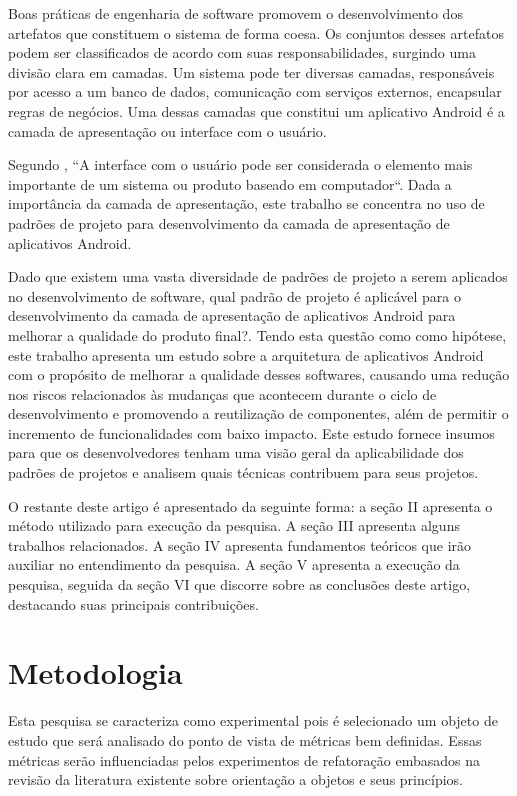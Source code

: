 \documentclass[conference]{IEEEtran}
\begin{document}
Boas práticas de engenharia de software promovem o desenvolvimento dos
artefatos que constituem o sistema de forma coesa. Os conjuntos desses artefatos
podem ser classificados de acordo com suas responsabilidades, surgindo
uma divisão clara em camadas. Um sistema pode ter diversas camadas, responsáveis
por acesso a um banco de dados, comunicação com serviços externos, encapsular
regras de negócios. Uma dessas camadas que constitui um aplicativo Android é a
camada de apresentação ou interface com o usuário.
 
Segundo \cite{pressman}, ``A interface com o usuário pode ser considerada
o elemento mais importante de um sistema ou produto baseado em computador``.
Dada a importância da camada de apresentação, este trabalho se concentra no uso
de padrões de projeto para desenvolvimento da camada de apresentação de
aplicativos Android.

Dado que existem uma vasta diversidade de padrões de projeto a serem aplicados
no desenvolvimento de software, qual padrão de projeto é aplicável para o
desenvolvimento da camada de apresentação de aplicativos Android para melhorar a
qualidade do produto final?. Tendo esta questão como como hipótese, este
trabalho apresenta um estudo sobre a arquitetura de aplicativos Android com o
propósito de melhorar a qualidade desses softwares, causando uma redução nos
riscos relacionados às mudanças que acontecem durante o ciclo de desenvolvimento
e promovendo a reutilização de componentes, além de permitir o incremento de
funcionalidades com baixo impacto. Este estudo fornece insumos para que os
desenvolvedores tenham uma visão geral da aplicabilidade dos padrões de projetos
e analisem quais técnicas contribuem para seus projetos.

O restante deste artigo é apresentado da seguinte forma: a seção II apresenta o
método utilizado para execução da pesquisa. A seção III apresenta alguns
trabalhos relacionados. A seção IV apresenta fundamentos teóricos que irão
auxiliar no entendimento da pesquisa. A seção V apresenta a execução da
pesquisa, seguida da seção VI que discorre sobre as conclusões deste artigo,
destacando suas principais contribuições.



\section{Metodologia}

Esta pesquisa se caracteriza como experimental pois é selecionado um objeto
de estudo que será analisado do ponto de vista de métricas bem definidas. Essas
métricas serão influenciadas pelos experimentos de refatoração embasados na
revisão da literatura existente sobre orientação a objetos e seus princípios.
\end{document}
